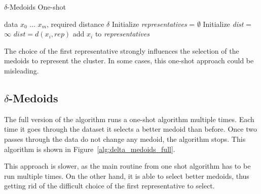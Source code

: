 \documentclass[thesis=B,english]{FITthesis}[2012/10/20]
\begin{document}
\begin{algorithm}\label{alg:delta_medoids_one_shot}
    \caption{$\delta$-Medoids One-shot}
    \label{delta_medoids_one_shot}
    \begin{algorithmic}[1]
        \INPUT data $x_0$ ... $x_m$, required distance $\delta$
        \STATE Initialize \textit{representatives} = $\emptyset$
            \STATE Initialize \textit{dist} = $\infty$
                    \STATE $dist = d(x_i, rep)$
                \ENDIF
            \ENDFOR
                \STATE add $x_i$ to \textit{representatives}
            \ENDIF
        \ENDFOR
    \end{algorithmic}
\end{algorithm}


The choice of the first representative strongly influences the selection of the medoids to represent the cluster.
In some cases, this one-shot approach could be misleading.

\subsection{$\delta$-Medoids}

The full version of the algorithm runs a one-shot algorithm multiple times.
Each time it goes through the dataset it selects a better medoid than before.
Once two passes through the data do not change any medoid, the algorithm stops.
This algorithm is shown in Figure~\ref{alg:delta_medoids_full}.

This approach is slower, as the main routine from one shot algorithm has to be run multiple times.
On the other hand, it is able to select better medoids, thus getting rid of the difficult choice of the first representative to select.
\end{document}
